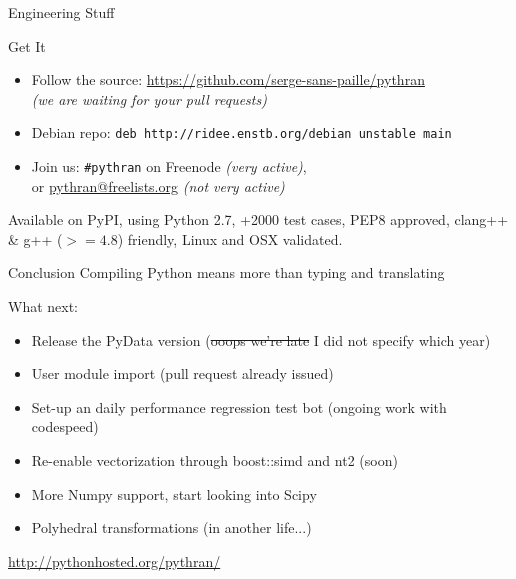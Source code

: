 \documentclass[aspectratio=1610]{beamer}
\begin{document}
\begin{frame}{Engineering Stuff}
    \begin{block}{Get It}
        \begin{itemize}
            \item Follow the source: \url{https://github.com/serge-sans-paille/pythran} \\ \textit{(we are waiting for your pull requests)}
            \item Debian repo: \texttt{deb http://ridee.enstb.org/debian unstable main}
            \item Join us: \texttt{\#pythran} on Freenode 
            \textit{(very active)}, \\ or \url{pythran@freelists.org} 
            \textit{(not very active)}
        \end{itemize}
    \end{block}

    Available on PyPI, using Python 2.7, +2000 test cases, PEP8 approved, clang++ \& g++ ($>=4.8$) friendly, Linux and OSX validated.
\end{frame}

\begin{frame}[fragile]{Conclusion}
    \normalsize
        \vfill
        Compiling Python means more than typing and translating\\
        \vfill
         {
        \vfill
        What next: 
        \vfill
        \begin{itemize}
          \item<2-> Release the PyData version  
            {\scriptsize{(\sout{ooops we're late} I did not specify which year)}}
          \item<4-> User module import \scriptsize{(pull request already issued)}
          \item<5-> Set-up an daily performance regression test bot \scriptsize{(ongoing work with codespeed)}
          \item<6-> Re-enable vectorization through boost::simd and nt2 \scriptsize{(soon)}
          \item<7-> More Numpy support, start looking into Scipy
          \item<8-> Polyhedral transformations \scriptsize{(in another life...)}
        \end{itemize}
        }
        \vfill
        \vfill
    \hfill\tiny{\url{http://pythonhosted.org/pythran/}}
\end{frame}
\end{document}
